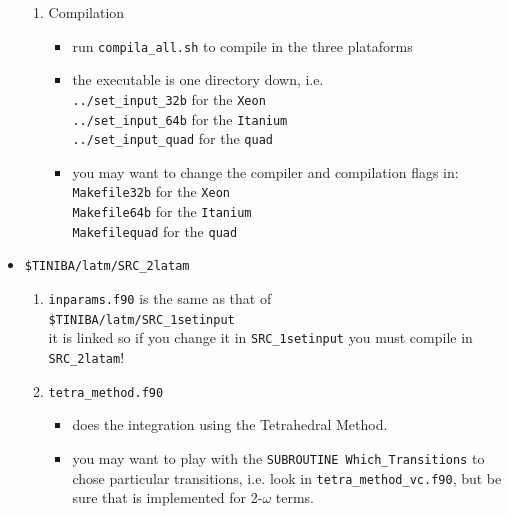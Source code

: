 \documentclass[openany,oneside]{book}
\numberwithin{equation}{section}
\begin{document}
\begin{itemize}
\begin{enumerate}
\item Compilation
\begin{itemize}
\item run \verb=compila_all.sh= to compile in the three plataforms
\item the executable is one directory down, i.e.\\
\verb=../set_input_32b= for the \verb=Xeon=\\
\verb=../set_input_64b= for the \verb=Itanium=\\
\verb=../set_input_quad= for the \verb=quad=
\item you may want to change the compiler and compilation flags in:\\
\verb=Makefile32b= for the \verb=Xeon=\\
\verb=Makefile64b= for the \verb=Itanium=\\
\verb=Makefilequad= for the \verb=quad=
\end{itemize}

\end{enumerate}

\item\verb=$TINIBA/latm/SRC_2latam=
\begin{enumerate}
\item\verb=inparams.f90= is the same as that of\\
\verb=$TINIBA/latm/SRC_1setinput=\\
it is linked so if you change it in \verb=SRC_1setinput=
 you must compile in \verb=SRC_2latam=!
\item \verb=tetra_method.f90=
\begin{itemize}
\item does the integration using the Tetrahedral Method.
\item you may want to play with the 
\verb=SUBROUTINE Which_Transitions= to chose particular transitions,
i.e. look in \verb=tetra_method_vc.f90=, but be sure that is
implemented for 2-$\omega$ terms.
\end{itemize}


\end{enumerate}
\end{itemize}
\end{document}
